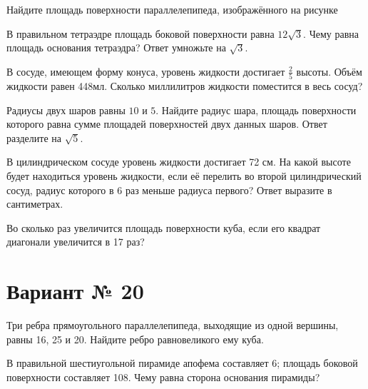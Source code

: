 \documentclass[4apaper]{article}
\begin{document}
\begin{taskBN}{1}
Найдите площадь поверхности параллелепипеда, изображённого на рисунке
\end{taskBN}

\begin{taskBN}{2}
В правильном тетраэдре площадь боковой поверхности равна $12\sqrt{3}$. Чему равна площадь основания тетраэдра? Ответ умножьте на $\sqrt{3}$.
\end{taskBN}

\begin{taskBN}{3}
В сосуде, имеющем форму конуса, уровень жидкости достигает $\frac{2}{5}$ высоты. Объём жидкости равен 448мл. Сколько миллилитров жидкости поместится в весь сосуд?
\end{taskBN}

\begin{taskBN}{4}
Радиусы двух шаров равны $10$ и $5$. Найдите радиус шара, площадь поверхности которого равна сумме площадей поверхностей двух данных шаров. Ответ разделите на $\sqrt{5}$.
\end{taskBN}

\begin{taskBN}{5}
В цилиндрическом сосуде уровень жидкости достигает 72 см. На какой высоте будет находиться уровень жидкости, если её перелить во второй цилиндрический сосуд, радиус которого в 6 раз меньше радиуса первого? Ответ выразите в сантиметрах.
\end{taskBN}

\begin{taskBN}{6}
Во сколько раз увеличится площадь поверхности куба, если его квадрат диагонали увеличится в 17 раз?
\end{taskBN}
\newpage\section*{Вариант № 20}

\begin{taskBN}{1}
Три ребра прямоугольного параллелепипеда, выходящие из одной вершины, равны 16, 25 и 20. Найдите ребро равновеликого ему куба.
\end{taskBN}

\begin{taskBN}{2}
В правильной шестиугольной пирамиде апофема составляет 6; площадь боковой поверхности составляет 108. Чему равна сторона основания пирамиды?
\end{taskBN}
\end{document}
